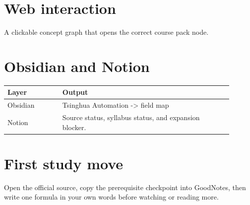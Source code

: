 \documentclass[11pt]{article}
\begin{document}
\section*{Web interaction}
A clickable concept graph that opens the correct course pack node.

\section*{Obsidian and Notion}
\begin{tabular}{p{0.22\linewidth}p{0.68\linewidth}}
\toprule
Layer & Output \\
\midrule
Obsidian & Tsinghua Automation -> field map \\
Notion & Source status, syllabus status, and expansion blocker. \\
\bottomrule
\end{tabular}

\section*{First study move}
Open the official source, copy the prerequisite checkpoint into GoodNotes, then write one formula in your own words before watching or reading more.
\end{document}
